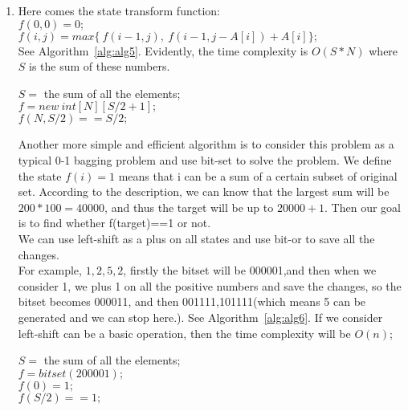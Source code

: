 \documentclass[12pt,a4paper]{article}
\makeatletter
\newtheorem*{solution}{Solution}
\renewenvironment{solution}[1][Solution] {\par\pushQED{\qed}\normalfont\topsep6\p@\@plus6\p@\relax\trivlist\item[\hskip\labelsep\bfseries#1\@addpunct{.}]\ignorespaces}{\popQED\endtrivlist\@endpefalse} \makeatother
\makeatother
\begin{document}
\begin{enumerate}
\begin{solution}
Here comes the state transform function: \\
$f(0,0) = 0;$\\
$f(i,j) = max\{~ f(i-1,j),~ f( i-1, j-A[i])+A[i] \};$\\

See Algorithm~\ref{alg:alg5}. Evidently, the time complexity is $O(S*N)$ where $S$ is the sum of these numbers. 

\begin{algorithm} 
  \label{alg:alg5}
  \caption{$judgeEqual$} 
  $S =$ the sum of all the elements;\\
  $f = new~int[N][S/2+1];$\\

  \For{$i \in [1,~n)$ }{
  	\For{$j \in [A[i],~S/2]$ }{
  		$f(i,j) = max\{~ f(i-1,j),~ f( i-1, j-A[i])+A[i] \};$\\
  	}
  }
  \Return $f(N,S/2) == S/2;$
\end{algorithm}

Another more simple and efficient algorithm is to consider this problem as a typical 0-1 bagging problem and use bit-set to solve the problem. We define the state $f(i)=1$ means that i can be a sum of a certain subset of original set. According to the description, we can know that the largest sum will be $200*100 = 40000$, and thus the target will be up to $20000+1$. Then our goal is to find whether f(target)==1 or not.\\
We can use left-shift as a plus on all states and use bit-or to save all the changes.\\
For example, ${1,2,5,2}$, firstly the bitset will be 000001,and then when we consider 1, we plus 1 on all the positive numbers and save the changes, so the bitset becomes 000011, and then 001111,101111(which means 5 can be generated and we can stop here.). See Algorithm~\ref{alg:alg6}.
If we consider left-shift can be a basic operation, then the time complexity will be $O(n)$;\\

\begin{algorithm} 
  \label{alg:alg6}
  \caption{$judgeEqualWithBitset$} 
  $S =$ the sum of all the elements;\\
  $f = bitset(200001);$\\
  $f(0)=1;$\\
  \For{$i \in [0,~n)$ }{
  	$f = f~|~(f<<A[i]);$\\
  }
  \Return $f(S/2) == 1;$
\end{algorithm}
\end{solution}

~\\
~\\

\end{enumerate}
\end{document}
